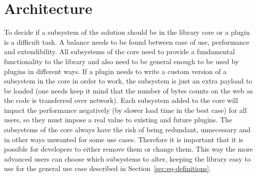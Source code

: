 \documentclass[a4paper,11pt]{kth-mag}
\begin{document}
    \section{Architecture}\label{sec:arcithecture}
      To decide if a subsystem of the solution should be in the library core or a plugin is a difficult task.
      A balance needs to be found between ease of use, performance and extendibility.
      All subsystems of the core need to provide a fundamental functionality to the library and also need to be general enough to be used by plugins in different ways.
      If a plugin needs to write a custom version of a subsystem in the core in order to work, the subsystem is just an extra payload to be loaded (one needs keep it mind that the number of bytes counts on the \gls{web} as the code is transferred over network).
      Each subsystem added to the core will impact the performance negatively (by slower load time in the best case) for all users, so they must impose a real value to existing and future plugins.
      The subsystems of the core always have the risk of being redundant, unnecessary and in other ways unwanted for some use cases.
      Therefore it is important that it is possible for developers to either remove them or change them.
      This way the more advanced users can choose which subsystems to alter, keeping the library easy to use for the general use case described in Section~\ref{sec:eq-definitions}.

      
\end{document}
